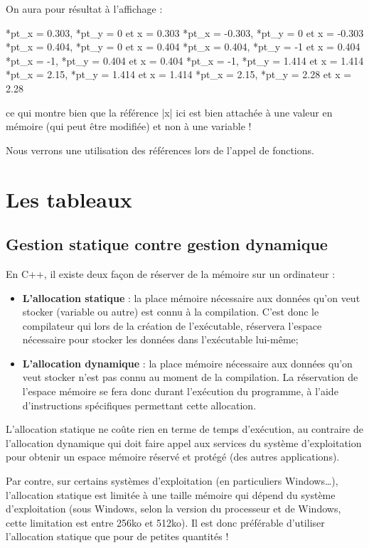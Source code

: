 On aura pour résultat à l'affichage :

\begin{inverseverbatim}
*pt_x = 0.303, *pt_y = 0 et x = 0.303
*pt_x = -0.303, *pt_y = 0 et x = -0.303
*pt_x = 0.404, *pt_y = 0 et x = 0.404
*pt_x = 0.404, *pt_y = -1 et x = 0.404
*pt_x = -1, *pt_y = 0.404 et x = 0.404
*pt_x = -1, *pt_y = 1.414 et x = 1.414
*pt_x = 2.15, *pt_y = 1.414 et x = 1.414
*pt_x = 2.15, *pt_y = 2.28 et x = 2.28
\end{inverseverbatim}

ce qui montre bien que la référence |x| ici est bien attachée à une valeur en mémoire (qui peut être modifiée)
et non à une variable !

Nous verrons une utilisation des références lors de l'appel de fonctions.

\section{Les tableaux}

\subsection{Gestion statique contre gestion dynamique}

En C++, il existe deux façon de réserver de la mémoire sur un ordinateur :
\begin{itemize}
  \item \textbf{L'allocation statique} : la place mémoire nécessaire aux données qu'on veut stocker (variable ou autre) est connu à la compilation. C'est donc le compilateur qui lors de la création de l'exécutable, réservera l'espace nécessaire pour stocker les données dans l'exécutable lui-même;
  \item \textbf{L'allocation dynamique} : la place mémoire nécessaire aux données qu'on veut stocker n'est pas connu au moment de la compilation. La réservation de l'espace mémoire se fera donc durant l'exécution du programme, à l'aide d'instructions spécifiques permettant cette allocation. 
\end{itemize}

L'allocation statique ne coûte rien en terme de temps d'exécution, au contraire de l'allocation dynamique qui doit faire appel aux services du système d'exploitation pour obtenir un espace mémoire réservé et protégé (des autres applications).

Par contre, sur certains systèmes d'exploitation (en particuliers Windows\ldots), l'allocation statique est limitée à une taille mémoire qui dépend du système d'exploitation (sous Windows, selon la version du processeur et de Windows, cette limitation est entre 256ko et 512ko). Il est donc préférable d'utiliser l'allocation statique que pour de petites quantités !

